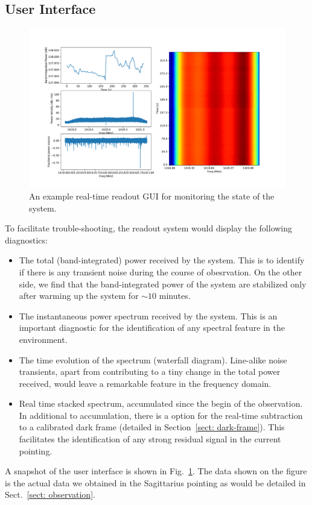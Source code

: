 \documentclass[12pt]{article}
\begin{document}
    \subsection{User Interface} \label{sect: software-gui}
    \begin{figure}
	    \centering
	    \includegraphics[width=\textwidth]{plots/readout-display-demo.pdf}
	    \caption{An example real-time readout GUI for monitoring the state of the system. } 
	    \label{fig: readout-gui-demo}
	\end{figure}
    To facilitate trouble-shooting, the readout system would display the following diagnostics:
    \begin{itemize}
        \item The total (band-integrated) power received by the system. This is to identify if there is any transient noise during the course of obesrvation. On the other side, we find that the band-integrated power of the system are stabilized only after warming up the system for $\sim 10$ minutes. 
        \item The instantaneous power spectrum received by the system. This is an important diagnostic for the identification of any spectral feature in the environment.
        \item The time evolution of the spectrum (waterfall diagram). Line-alike noise transients, apart from contributing to a tiny change in the total power received, would leave a remarkable feature in the frequency domain.
        \item Real time stacked spectrum, accumulated since the begin of the observation. In additional to accumulation, there is a option for the real-time subtraction to a calibrated dark frame (detailed in Section~\ref{sect: dark-frame}). This facilitates the identification of any strong residual signal in the current pointing.
    \end{itemize}
    A snapshot of the user interface is shown in Fig.~\ref{fig: readout-gui-demo}. 
    The data shown on the figure is the actual data we obtained in the Sagittarius pointing as would be detailed in Sect.~\ref{sect: observation}.
    
\end{document}
